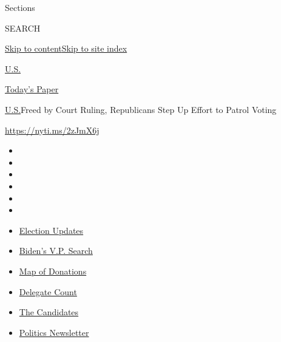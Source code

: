 Sections

SEARCH

\protect\hyperlink{site-content}{Skip to
content}\protect\hyperlink{site-index}{Skip to site index}

\href{https://www.nytimes3xbfgragh.onion/section/us}{U.S.}

\href{https://myaccount.nytimes3xbfgragh.onion/auth/login?response_type=cookie\&client_id=vi}{}

\href{https://www.nytimes3xbfgragh.onion/section/todayspaper}{Today's
Paper}

\href{/section/us}{U.S.}\textbar{}Freed by Court Ruling, Republicans
Step Up Effort to Patrol Voting

\url{https://nyti.ms/2zJmX6j}

\begin{itemize}
\item
\item
\item
\item
\item
\item
\end{itemize}

\begin{itemize}
\item
  \href{https://www.nytimes3xbfgragh.onion/2020/08/04/us/elections/primary-election-michigan-arizona-kansas.html?action=click\&pgtype=Article\&state=default\&region=TOP_BANNER\&context=storylines_menu}{Election
  Updates}
\item
  \href{https://www.nytimes3xbfgragh.onion/article/biden-vice-president-2020.html?action=click\&pgtype=Article\&state=default\&region=TOP_BANNER\&context=storylines_menu}{Biden's
  V.P. Search}
\item
  \href{https://www.nytimes3xbfgragh.onion/interactive/2020/07/24/us/politics/trump-biden-campaign-donors.html?action=click\&pgtype=Article\&state=default\&region=TOP_BANNER\&context=storylines_menu}{Map
  of Donations}
\item
  \href{https://www.nytimes3xbfgragh.onion/interactive/2020/us/elections/delegate-count-primary-results.html?action=click\&pgtype=Article\&state=default\&region=TOP_BANNER\&context=storylines_menu}{Delegate
  Count}
\item
  \href{https://www.nytimes3xbfgragh.onion/interactive/2019/us/politics/2020-presidential-candidates.html?action=click\&pgtype=Article\&state=default\&region=TOP_BANNER\&context=storylines_menu}{The
  Candidates}
\item
  \href{https://www.nytimes3xbfgragh.onion/newsletters/politics?action=click\&pgtype=Article\&state=default\&region=TOP_BANNER\&context=storylines_menu}{Politics
  Newsletter}
\end{itemize}

